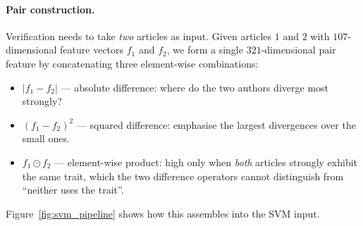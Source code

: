 \documentclass[11pt]{article}
\begin{document}
\paragraph{Pair construction.}
Verification needs to take \emph{two} articles as input. Given articles $1$
and $2$ with $107$-dimensional feature vectors $f_{1}$ and $f_{2}$, we form a
single $321$-dimensional pair feature by concatenating three element-wise
combinations:
\begin{itemize}\setlength\itemsep{1pt}
  \item $|f_{1} - f_{2}|$ --- absolute difference: where do the two authors
        diverge most strongly?
  \item $(f_{1} - f_{2})^{2}$ --- squared difference: emphasise the largest
        divergences over the small ones.
  \item $f_{1} \odot f_{2}$ --- element-wise product: high only when
        \emph{both} articles strongly exhibit the same trait, which the two
        difference operators cannot distinguish from ``neither uses the
        trait''.
\end{itemize}
Figure~\ref{fig:svm_pipeline} shows how this assembles into the SVM input.
\end{document}

